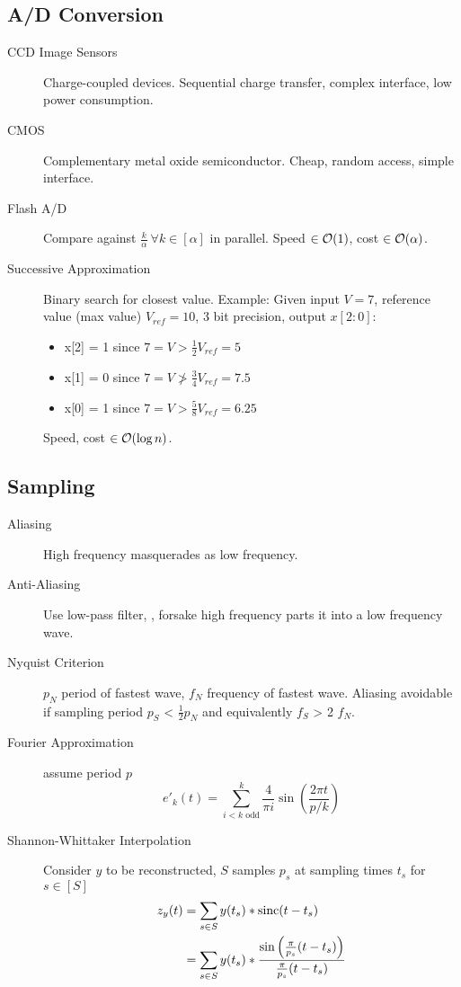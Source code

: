 

\subsection{A/D Conversion}
\begin{description}
	\item[CCD Image Sensors] Charge-coupled devices. Sequential charge transfer,
	complex interface, low power consumption.
	\item[CMOS] Complementary metal oxide semiconductor. Cheap, random access,
	simple interface.
	\item[Flash A/D] Compare against $\frac{k}{\alpha} \ \forall k \in [\alpha]$
	in parallel. Speed $\in \operatorname{\mathcal{O}}(1)$, cost $\in \operatorname{\mathcal{O}}(\alpha)$.
	\item[Successive Approximation] Binary search for closest value. Example:
	Given input $V = 7$, reference value (max value) $V_{ref} = 10$, 3 bit
	precision,
	output $x[2:0]$:
	\begin{itemize}
		\item x[2] = 1 since $7 = V > \frac{1}{2} V_{ref} = 5$
		\item x[1] = 0 since $7 = V \ngtr \frac{3}{4} V_{ref} = 7.5$
		\item x[0] = 1 since $7 = V > \frac{5}{8} V_{ref} = 6.25$
	\end{itemize}
	Speed, cost $\in \operatorname{\mathcal{O}}(\log n)$.
\end{description}

\subsection{Sampling}

\begin{description}
	\item[Aliasing] High frequency masquerades as low frequency. 
	\item[Anti-Aliasing] Use low-pass filter, \ie, forsake high frequency parts
	 it into a low frequency wave.
	\item[Nyquist Criterion] $p_N$ period of fastest wave, $f_N$ frequency of
	fastest wave. Aliasing avoidable if sampling period $p_S$ < $\frac{1}{2} p_N$
	and equivalently $f_S$ > 2 $f_N$.
	\item[Fourier Approximation] assume period $p$
	\[ 
	e'_k(t) = \sum^{k}_{i < k \text{ odd}}\frac{4}{\pi i} \sin\left(\frac{2\pi t}
	{p/k}\right)
	\]
	\item[Shannon-Whittaker Interpolation] Consider $y$ to be reconstructed, $S$
	samples $p_s$ at sampling times $t_s$ for $s \in [S]$
	\begin{align*}
	z_y(t) 	&= \sum_{s \in S} y(t_s) * \operatorname{sinc}(t - t_s)\\
	 		&= \sum_{s \in S} y(t_s) * \frac{\sin\left(\frac{\pi}{p_s}(t-t_s)\right)}
	 		{\frac{\pi}{p_s}(t-t_s)}
	\end{align*}
\end{description}

